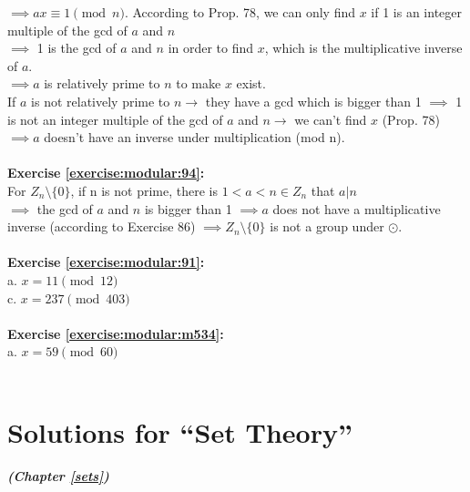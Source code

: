 $\implies ax \equiv 1 \pmod{n}$.
According to Prop. 78, we can only find $x$ if 1 is an integer multiple of the gcd of $a$ and $n$\\
$\implies$  1 is the gcd of $a$ and $n$ in order to find $x$, which is the multiplicative inverse of $a$.\\
$\implies a$ is relatively prime to $n$ to make $x$ exist.\\
If $a$ is not relatively prime to $n \to$ they have a gcd which is bigger than 1 $\implies$  1 is not an integer multiple of the gcd of $a$ and $n \to$ we can't find $x$ (Prop. 78) $\implies a$ doesn't have an inverse under multiplication (mod n).\\
\\
\textbf{Exercise \ref{exercise:modular:94}:}\\
For $Z_n \setminus \{0\}$, if n is not prime, there is $1<a<n \in Z_n$ that $a|n$\\
$\implies$  the gcd of $a$ and $n$ is bigger than 1 $\implies a$ does not have a multiplicative inverse (according to Exercise 86) $\implies Z_n \setminus \{0\}$ is not a group under $\odot$.\\
\\
\textbf{Exercise \ref{exercise:modular:91}:}\\
a. $x=11 \pmod{12}$\\
c. $x=237 \pmod{403}$\\
\\
\textbf{Exercise \ref{exercise:modular:m534}:}\\%
a. $x=59 \pmod{60}$\\
\\

\section{Solutions for ``Set Theory''}
\noindent\textbf{\textit{ (Chapter \ref{sets})}}\bigskip

